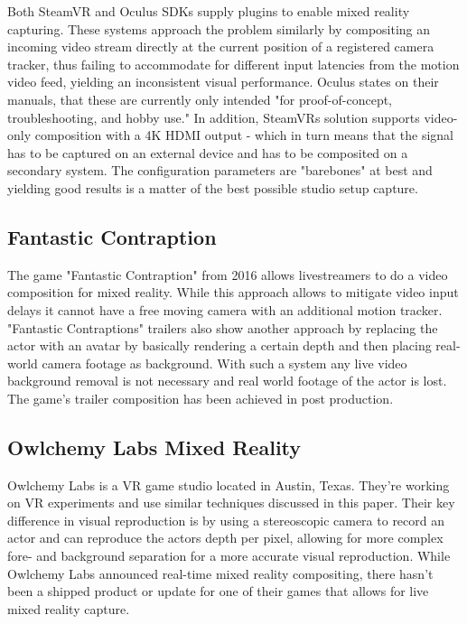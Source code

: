 Both SteamVR and Oculus SDKs supply plugins to enable mixed reality capturing. 
These systems approach the problem similarly by compositing an incoming video 
stream directly at the current position of a registered camera tracker, thus 
failing to accommodate for different input latencies from the motion video 
feed, yielding an inconsistent visual performance. Oculus states on their 
manuals, that these are currently only intended "for proof-of-concept, 
troubleshooting, and hobby use." \cite{oculus:mr-setup:2017}
\newline
In addition, SteamVRs solution supports video-only composition with a 4K 
HDMI output - which in turn means that the signal has to be captured on an 
external device and has to be composited on a secondary system. The 
configuration parameters are "barebones" at best and yielding good results is a 
matter of the best possible studio setup capture.

\subsection{Fantastic Contraption}

The game "Fantastic Contraption" from 2016 allows livestreamers to do a video 
composition for mixed reality. While this approach allows to mitigate video 
input delays it cannot have a free moving camera with an additional motion 
tracker.
\newline
"Fantastic Contraptions" trailers also show another approach by replacing the 
actor with an avatar by basically rendering a certain depth and then placing 
real-world camera footage as background. With such a system any live video 
background removal is not necessary and real world footage of the actor is 
lost. The game's trailer composition has been achieved in post production. 
\cite{gartner:cinematography:2017}

\subsection{Owlchemy Labs Mixed Reality}

Owlchemy Labs is a VR game studio located in Austin, Texas. They're working 
on VR experiments and use similar techniques discussed in this paper. Their key 
difference in visual reproduction is by using a stereoscopic camera to record 
an actor and can reproduce the actors depth per pixel, allowing for more 
complex fore- and background separation for a more accurate visual reproduction.
\newline
While Owlchemy Labs announced real-time mixed reality compositing, there hasn't 
been a shipped product or update for one of their games that allows for live 
mixed reality capture\cite{owlchemy:mr:3:2017}.

